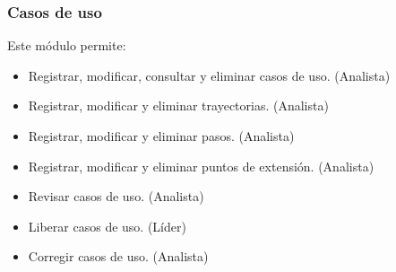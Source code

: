 \subsubsection{Casos de uso}
	Este módulo permite:
	\begin{itemize}
		\item Registrar, modificar, consultar y eliminar casos de uso. (Analista)
		\item Registrar, modificar y eliminar trayectorias. (Analista)
		\item Registrar, modificar y eliminar pasos. (Analista)
		\item Registrar, modificar y eliminar puntos de extensión. (Analista)
		\item Revisar casos de uso. (Analista)
		\item Liberar casos de uso. (Líder)
		\item Corregir casos de uso. (Analista)	
	\end{itemize}